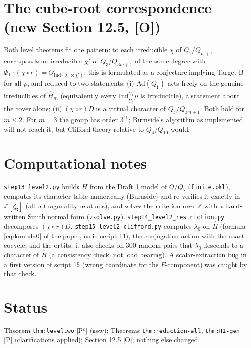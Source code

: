 \documentclass[11pt]{article}
\newcommand{\Z}{\mathbb Z}
\begin{document}
\section*{The cube-root correspondence (new Section 12.5, [O])}
Both level theorems fit one pattern: to each irreducible $\chi$ of
$Q_1/Q_{m+1}$ corresponds an irreducible $\chi'$ of $Q_3/Q_{3m+1}$ of the
same degree with $\Phi_1\cdot(\chi\circ r)=\Theta_{\mathrm{Ind}(\lambda_0\otimes\chi')}$;
this is formulated as a conjecture implying Target B for all $\rho$,
and reduced to two statements: (i) $\mathrm{Ad}(Q_1)$ acts freely on the
genuine irreducibles of $\hat H_m$ (equivalently every
$\mathrm{Ind}_{\tilde U_3}^{\tilde U_1}\mu$ is irreducible), a statement
about the cover alone; (ii) $(\chi\circ r)D$ is a virtual character of
$Q_3/Q_{3m+1}$.  Both hold for $m\le2$.  For $m=3$ the group has order
$3^{11}$; Burnside's algorithm as implemented will not reach it, but
Clifford theory relative to $Q_4/Q_{10}$ would.

\section*{Computational notes}
\texttt{step13\_level2.py} builds $H$ from the Draft 1 model of $Q/Q_7$
(\texttt{finite.pkl}), computes its character table numerically
(Burnside) and re-verifies it exactly in $\Z[\zeta_3]$ (all
orthogonality relations), and solves the criterion over $\Z$ with a
hand-written Smith normal form (\texttt{zsolve.py}).
\texttt{step14\_level2\_restriction.py} decomposes $(\chi\circ r)D$.
\texttt{step15\_level2\_clifford.py} computes $\lambda_0$ on $\hat H$
(formula \eqref{eq:lambda0} of the paper, as in script 11), the
conjugation action with the exact cocycle, and the orbits; it also
checks on $300$ random pairs that $\lambda_0$ descends to a character of
$\hat H$ (a consistency check, not load bearing).  A scalar-extraction
bug in a first version of script 15 (wrong coordinate for the
$F$-component) was caught by that check.

\section*{Status}
Theorem \texttt{thm:leveltwo} [P$^c$] (new); Theorems
\texttt{thm:reduction-all}, \texttt{thm:H1-gen} [P] (clarifications
applied); Section 12.5 [O]; nothing else changed.
\end{document}
